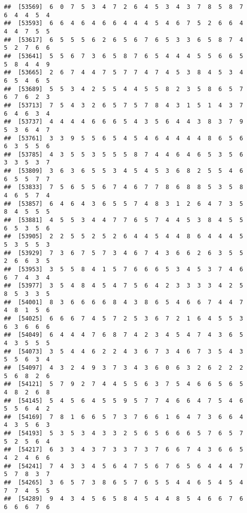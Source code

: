 \documentclass[
]{book}
\begin{document}
\begin{verbatim}
##  [53569]  6  0  7  5  3  4  7  2  6  4  5  3  4  3  7  8  5  8  7  6  4  4  5  4
##  [53593]  6  6  4  6  4  6  6  4  4  4  5  4  6  7  5  2  6  6  4  4  4  7  5  5
##  [53617]  6  5  5  5  6  2  6  5  6  7  6  5  3  3  6  5  8  7  4  5  2  7  6  6
##  [53641]  5  5  6  7  3  6  5  8  7  6  5  4  4  4  5  5  6  6  5  5  8  4  4  9
##  [53665]  2  6  7  4  4  7  5  7  7  4  7  4  5  3  8  4  5  3  4  6  5  4  6  5
##  [53689]  5  5  3  4  2  5  5  4  4  5  5  8  2  3  5  8  6  5  7  6  7  6  2  3
##  [53713]  7  5  4  3  2  6  5  7  5  7  8  4  3  1  5  1  4  3  7  6  4  6  3  4
##  [53737]  4  4  4  4  6  6  6  5  4  3  5  6  4  4  3  8  3  7  9  5  3  6  4  7
##  [53761]  3  3  9  5  5  6  5  4  5  4  6  4  4  4  4  8  6  5  6  6  3  5  5  6
##  [53785]  4  3  5  5  3  5  5  5  8  7  4  4  6  4  6  5  3  5  6  3  3  5  3  7
##  [53809]  3  6  3  6  5  5  3  4  5  4  5  3  6  8  2  5  5  4  6  6  5  5  7  7
##  [53833]  7  5  6  5  5  6  7  4  6  7  7  8  6  8  8  5  3  5  8  4  6  5  7  4
##  [53857]  6  4  6  4  3  6  5  5  7  4  8  3  1  2  6  4  7  3  5  8  4  5  5  5
##  [53881]  4  5  5  3  4  4  7  7  6  5  7  4  4  5  3  8  4  5  5  6  5  3  5  6
##  [53905]  2  2  5  5  2  5  2  6  4  4  5  4  4  8  6  4  4  4  5  5  3  5  5  3
##  [53929]  7  3  6  7  5  7  3  4  6  7  4  3  6  6  2  6  3  5  5  2  6  6  3  5
##  [53953]  3  5  5  8  4  1  5  7  6  6  6  5  3  4  5  3  7  4  6  6  7  4  3  4
##  [53977]  3  5  4  8  4  5  4  7  5  6  4  2  3  3  3  3  4  2  5  8  5  3  3  5
##  [54001]  8  3  6  6  6  6  8  4  3  8  6  5  4  6  6  7  4  4  7  4  8  1  5  6
##  [54025]  6  6  6  7  4  5  7  2  5  3  6  7  2  1  6  4  5  5  3  6  3  6  6  6
##  [54049]  6  4  4  4  7  6  8  7  4  2  3  4  5  4  7  4  3  6  5  4  3  5  5  5
##  [54073]  3  5  4  4  6  2  2  4  3  6  7  3  4  6  7  3  5  4  3  5  5  6  3  4
##  [54097]  4  3  2  4  9  3  7  3  4  3  6  0  6  3  2  6  2  2  2  5  6  8  2  6
##  [54121]  5  7  9  2  7  4  4  5  5  6  3  7  5  4  6  6  5  6  5  4  8  2  6  8
##  [54145]  5  4  5  6  4  5  5  9  5  7  7  4  6  6  4  7  5  4  6  5  5  6  4  2
##  [54169]  7  8  1  6  6  5  7  3  7  6  6  1  6  4  7  3  6  6  4  4  3  5  6  3
##  [54193]  5  3  5  3  4  3  3  2  5  6  5  6  6  6  5  7  6  5  7  5  2  5  6  4
##  [54217]  6  3  3  4  3  7  3  3  7  3  7  6  6  7  4  3  6  6  5  4  2  4  6  6
##  [54241]  7  4  3  3  4  5  6  4  7  5  6  7  6  5  6  4  4  4  7  5  7  8  3  7
##  [54265]  3  6  5  7  3  8  6  5  7  6  5  5  4  4  6  5  4  5  4  7  7  4  5  5
##  [54289]  9  4  3  4  5  6  5  8  4  5  4  4  8  5  4  6  6  7  6  6  6  6  7  6

\end{verbatim}
\end{document}
